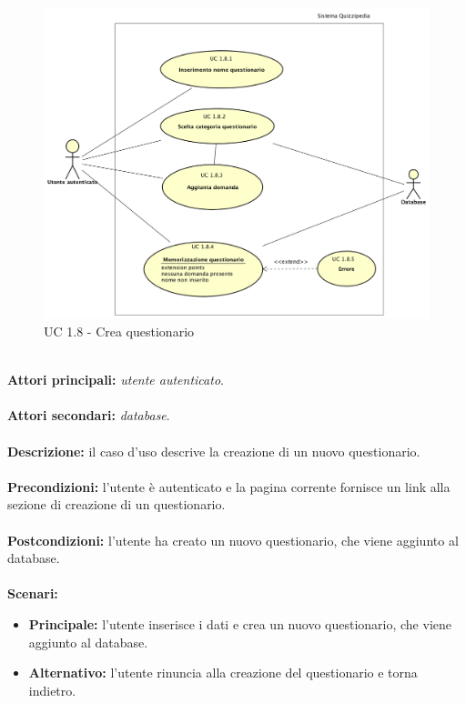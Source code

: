 \documentclass[a4paper,11pt]{article}
\begin{document}
\begin{figure}[h!]
\centering
\includegraphics[scale=0.4]{../immagini/UC1_8.png}
\caption{UC 1.8 - Crea questionario}
\end{figure}
\ \\
\textbf{Attori principali:} \textit{utente autenticato}.\\
\\
\textbf{Attori secondari:} \textit{database}.\\
\\
\textbf{Descrizione:} il caso d'uso descrive la creazione di un nuovo questionario. \\
\\
\textbf{Precondizioni:} l'utente è autenticato e la pagina corrente fornisce un link alla sezione di creazione di un questionario.\\
\\
\textbf{Postcondizioni:} l'utente ha creato un nuovo questionario, che viene aggiunto al database. \\
\\
\textbf{Scenari:}
\begin{itemize}
\item \textbf{Principale:} l'utente inserisce i dati e crea un nuovo questionario, che viene aggiunto al database.
\item \textbf{Alternativo:} l'utente rinuncia alla creazione del questionario e torna indietro.\\ 
\end{itemize}
\vspace{6 mm}
\end{document}
